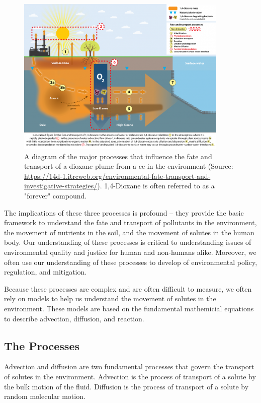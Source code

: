\documentclass{tufte-handout}\usepackage[]{graphicx}\usepackage[]{xcolor}
\begin{document}
\begin{figure}
\centering
\includegraphics[width=0.9\textwidth]{graphics/Dioxane_plume.png}
\caption{A diagram of the major processes that influence the fate and transport of a dioxane plume from a ce in the environment (Source: \url{https://14d-1.itrcweb.org/environmental-fate-transport-and-investigative-strategies/}). 1,4-Dioxane is often referred to as a "forever" compound.}
\label{fig:dioxaneplume}
\end{figure}

The implications of these three processes is profound -- they provide the basic framework to understand the fate and transport of pollutants in the environment, the movement of nutrients in the soil, and the movement of solutes in the human body. Our understanding of these processes is critical to understanding issues of environmental quality and justice for human and non-humans alike. Moreover, we often use our understanding of these processes to develop of environmental policy, regulation, and mitigation.

Because these processes are complex and are often difficult to measure, we often rely on models to help us understand the movement of solutes in the environment. These models are based on the fundamental mathemicial equations to describe advection, diffusion, and reaction.

\subsection{The Processes}

Advection and diffusion are two fundamental processes that govern the transport of solutes in the environment. Advection is the process of transport of a solute by the bulk motion of the fluid. Diffusion is the process of transport of a solute by random molecular motion.
\end{document}
